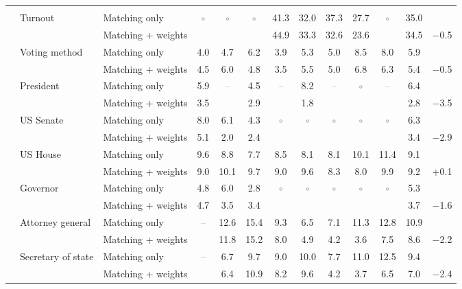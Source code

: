 \begin{table}[!htbp]
{\begin{threeparttable}
\begin{tabular}{llcccccccccc}
\addlinespace[0.3em]
\multicolumn{12}{l}{Non-demographic} \\
\addlinespace[0.1em]
~~Turnout & Matching only & \textcolor{gray}{$\circ$} & \textcolor{gray}{$\circ$} & \textcolor{gray}{$\circ$} & 41.3 & 32.0 & 37.3 & 27.7 & \textcolor{gray}{$\circ$} & 35.0 & \\
 & Matching + weights &  &  &  & 44.9 & 33.3 & 32.6 & 23.6 &  & 34.5 & $-$0.5 \\
\addlinespace[0.1em]
~~Voting method & Matching only & 4.0 & 4.7 & 6.2 & 3.9 & 5.3 & 5.0 & 8.5 & 8.0 & 5.9 & \\
 & Matching + weights & 4.5 & 6.0 & 4.8 & 3.5 & 5.5 & 5.0 & 6.8 & 6.3 & 5.4 & $-$0.5 \\
\addlinespace[0.1em]
~~President & Matching only & 5.9 & \textcolor{gray}{--} & 4.5 & \textcolor{gray}{--} & 8.2 & \textcolor{gray}{--} & \textcolor{gray}{$\circ$} & \textcolor{gray}{--} & 6.4 & \\
 & Matching + weights & 3.5 &  & 2.9 &  & 1.8 &  &  &  & 2.8 & $-$3.5 \\
\addlinespace[0.1em]
~~US Senate & Matching only & 8.0 & 6.1 & 4.3 & \textcolor{gray}{$\circ$} & \textcolor{gray}{$\circ$} & \textcolor{gray}{$\circ$} & \textcolor{gray}{$\circ$} & \textcolor{gray}{$\circ$} & 6.3 & \\
 & Matching + weights & 5.1 & 2.0 & 2.4 &  &  &  &  &  & 3.4 & $-$2.9 \\
\addlinespace[0.1em]
~~US House & Matching only & 9.6 & 8.8 & 7.7 & 8.5 & 8.1 & 8.1 & 10.1 & 11.4 & 9.1 & \\
 & Matching + weights & 9.0 & 10.1 & 9.7 & 9.0 & 9.6 & 8.3 & 8.0 & 9.9 & 9.2 & +0.1 \\
\addlinespace[0.1em]
~~Governor & Matching only & 4.8 & 6.0 & 2.8 & \textcolor{gray}{$\circ$} & \textcolor{gray}{$\circ$} & \textcolor{gray}{$\circ$} & \textcolor{gray}{$\circ$} & \textcolor{gray}{$\circ$} & 5.3 & \\
 & Matching + weights & 4.7 & 3.5 & 3.4 &  &  &  &  &  & 3.7 & $-$1.6 \\
\addlinespace[0.1em]
~~Attorney general & Matching only & \textcolor{gray}{--} & 12.6 & 15.4 & 9.3 & 6.5 & 7.1 & 11.3 & 12.8 & 10.9 & \\
 & Matching + weights &  & 11.8 & 15.2 & 8.0 & 4.9 & 4.2 & 3.6 & 7.5 & 8.6 & $-$2.2 \\
\addlinespace[0.1em]
~~Secretary of state & Matching only & \textcolor{gray}{--} & 6.7 & 9.7 & 9.0 & 10.0 & 7.7 & 11.0 & 12.5 & 9.4 & \\
 & Matching + weights &  & 6.4 & 10.9 & 8.2 & 9.6 & 4.2 & 3.7 & 6.5 & 7.0 & $-$2.4 \\

\end{tabular}
\end{threeparttable}}
\end{table}
